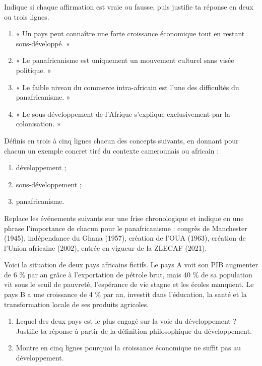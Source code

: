 \documentclass[11pt]{article}
\newcommand{\cle}[1]{{\popxbold\color{popdark}#1}}
\newcounter{popsec}
\newcounter{popsub}
\newcommand{\courssub}[1]{%
  \stepcounter{popsub}%
  \par\vspace{9pt}\noindent{\popxbold\fontsize{11.5}{13}\selectfont\color{popink}{\color{poporange}\thepopsec.\thepopsub}\hspace{6pt}#1}\par\nopagebreak\vspace{4pt}
}
\begin{document}
\begin{exercice}
Indique si chaque affirmation est vraie ou fausse, puis justifie ta réponse en deux ou trois lignes.
\begin{enumerate}
\item « Un pays peut connaître une forte croissance économique tout en restant sous-développé. »
\item « Le panafricanisme est uniquement un mouvement culturel sans visée politique. »
\item « Le faible niveau du commerce intra-africain est l'une des difficultés du panafricanisme. »
\item « Le sous-développement de l'Afrique s'explique exclusivement par la colonisation. »
\end{enumerate}
\end{exercice}

\begin{exercice}[Définitions]
Définis en trois à cinq lignes chacun des concepts suivants, en donnant pour chacun un exemple concret tiré du contexte camerounais ou africain :
\begin{enumerate}
\item \cle{développement} ;
\item \cle{sous-développement} ;
\item \cle{panafricanisme}.
\end{enumerate}
\end{exercice}

\begin{exercice}
Replace les événements suivants sur une frise chronologique et indique en une phrase l'importance de chacun pour le panafricanisme : congrès de Manchester (1945), indépendance du Ghana (1957), création de l'OUA (1963), création de l'Union africaine (2002), entrée en vigueur de la ZLECAF (2021).
\end{exercice}

\courssub{Je m'entraîne}

\begin{exercice}
Voici la situation de deux pays africains fictifs. Le pays A voit son PIB augmenter de 6 \% par an grâce à l'exportation de pétrole brut, mais 40 \% de sa population vit sous le seuil de pauvreté, l'espérance de vie stagne et les écoles manquent. Le pays B a une croissance de 4 \% par an, investit dans l'éducation, la santé et la transformation locale de ses produits agricoles.
\begin{enumerate}
\item Lequel des deux pays est le plus engagé sur la voie du développement ? Justifie ta réponse à partir de la définition philosophique du développement.
\item Montre en cinq lignes pourquoi la croissance économique ne suffit pas au développement.
\end{enumerate}
\end{exercice}
\end{document}
